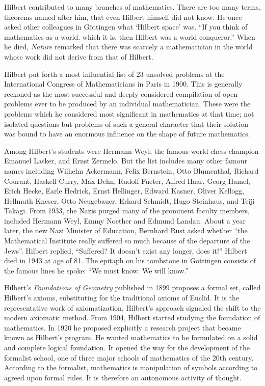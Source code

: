 \documentclass{article}
\begin{document}
Hilbert contributed to many branches of mathematics. There are too many terms, theorems named after him, that even Hilbert himself did not know. He once asked other colleagues in Göttingen what `Hilbert space' was. ``If you think of mathematics as a world. which it is, then Hilbert was a world conqueror.'' When he died, {\em Nature} remarked that there was scarcely a mathematician in the world whose work did not derive from that of Hilbert.\cite{Ried-1996}

Hilbert put forth a most influential list of 23 unsolved problems at the International Congress of Mathematicians in Paris in 1900. This is generally reckoned as the most successful and deeply considered compilation of open problems ever to be produced by an individual mathematician. These were the problems which he considered most significant in mathematics at that time; not isolated questions but problems of such a general character that their solution was bound to have an enormous influence on the shape of future mathematics.

Among Hilbert's students were Hermann Weyl, the famous world chess champion Emanuel Lasker, and Ernst Zermelo. But the list includes many other famour names including Wilhelm Ackermann, Felix Bernstein, Otto Blumenthal, Richard Courant, Haskell Curry, Max Dehn, Rudolf Fueter, Alfred Haar, Georg Hamel, Erich Hecke, Earle Hedrick, Ernst Hellinger, Edward Kasner, Oliver Kellogg, Hellmuth Kneser, Otto Neugebauer, Erhard Schmidt, Hugo Steinhaus, and Teiji Takagi. From 1933, the Nazis purged many of the prominent faculty members, included Hermann Weyl, Emmy Noether and Edmund Landau. About a year later, the new Nazi Minister of Education, Bernhard Rust asked whether ``the Mathematical Institute really suffered so much because of the departure of the Jews''. Hilbert replied, ``Suffered? It doesn't exist any longer, does it!'' Hilbert died in 1943 at age of 81. The epitaph on his tombstone in Göttingen consists of the famous lines he spoke: ``We must know. We will know.''

Hilbert's {\em Foundations of Geometry} published in 1899 proposes a formal set, called Hilbert's axioms, substituting for the traditional axioms of Euclid. It is the representative work of axiomatization. Hilbert's approach signaled the shift to the modern axiomatic method. From 1904, Hilbert started studying the foundation of mathematics. In 1920 he proposed explicitly a research project that became known as Hilbert's program. He wanted mathematics to be formulated on a solid and complete logical foundation. It opened the way for the development of the formalist school, one of three major schools of mathematics of the 20th century. According to the formalist, mathematics is manipulation of symbols according to agreed upon formal rules. It is therefore an autonomous activity of thought.
\end{document}
